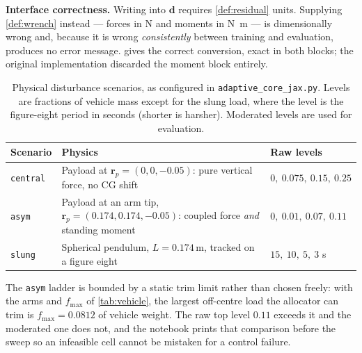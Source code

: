 \documentclass[11pt,a4paper,twoside,openright]{report}
\makeatletter
\renewcommand{\subsection}{\FloatBarrier\old@subsection}}
\newcommand{\vTether}{0.174}             %
\renewcommand{\vec}[1]{\bm{#1}}
\newcommand{\dres}{\vec{d}}
\theoremstyle{plain}
\theoremstyle{definition}
\theoremstyle{remark}
\makeatother
\begin{document}
	\begin{cautionbox}
		\textbf{Interface correctness.} Writing into $\dres$ requires
		\cref{def:residual} units. Supplying \cref{def:wrench} instead --- forces in
		\si{\newton} and moments in \si{\newton\metre} --- is dimensionally wrong and,
		because it is wrong \emph{consistently} between training and evaluation,
		produces no error message.  gives the correct conversion,
		exact in both blocks; the original implementation discarded the moment block
		entirely.
	\end{cautionbox}

	\subsection{Disturbance scenarios}

	\begin{table}[htbp]
		\centering
		\caption{Physical disturbance scenarios, as configured in
			\texttt{adaptive\_core\_jax.py}. Levels are fractions of vehicle mass except
			for the slung load, where the level is the figure-eight period in seconds
			(shorter is harsher). Moderated levels are used for evaluation.}
		\label{tab:scenarios}
		\small
		\begin{tabularx}{\linewidth}{@{}l X l@{}}
			\toprule
			\textbf{Scenario} & \textbf{Physics} & \textbf{Raw levels} \\
			\midrule
			\texttt{central} & Payload at $\vec r_p=(0,0,-0.05)$: pure vertical force, no CG shift & $0,\ 0.075,\ 0.15,\ 0.25$ \\
			\texttt{asym} & Payload at an arm tip, $\vec r_p=(0.174,0.174,-0.05)$: coupled force \emph{and} standing moment & $0,\ 0.01,\ 0.07,\ 0.11$ \\
			\texttt{slung} & Spherical pendulum, $L=\vTether\,\si{\metre}$, tracked on a figure eight & $15,\ 10,\ 5,\ 3$ \si{\second} \\
			\bottomrule
		\end{tabularx}
	\end{table}

	The \texttt{asym} ladder is bounded by a static trim limit rather than chosen
	freely: with the arms and $f_{\max}$ of \cref{tab:vehicle}, the largest
	off-centre load the allocator can trim is $f_{\max}=\num{0.0812}$ of vehicle
	weight. The raw top level $0.11$ exceeds it and the moderated one does not, and
	the notebook prints that comparison before the sweep so an infeasible cell
	cannot be mistaken for a control failure.
\end{document}
